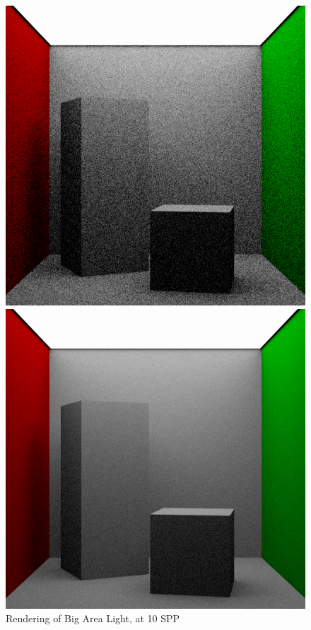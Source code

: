 \documentclass[a4paper]{myarticle}
\begin{document}
\begin{figure}[H]
  \begin{minipage}[t]{.3\textwidth}
      \centering
      \includegraphics[width=\textwidth]{q3/big_1_10.png}
      \caption{Rendering of Big Area Light, at 10 SPP}
  \end{minipage}
  \hfill
  \begin{minipage}[t]{.3\textwidth}
      \centering
      \includegraphics[width=\textwidth]{q3/big_1_100.png}

\end{minipage}
\end{figure}
\end{document}
